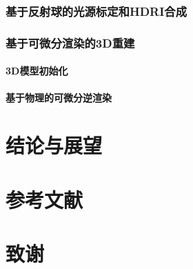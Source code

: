 \documentclass{ctexart}
\begin{document}
\subsubsection{基于反射球的光源标定和HDRI合成}

\subsubsection{基于可微分渲染的3D重建}

\paragraph{3D模型初始化}

\paragraph{基于物理的可微分逆渲染}

\section{结论与展望}

\section*{参考文献}

\section*{致谢}
\end{document}
